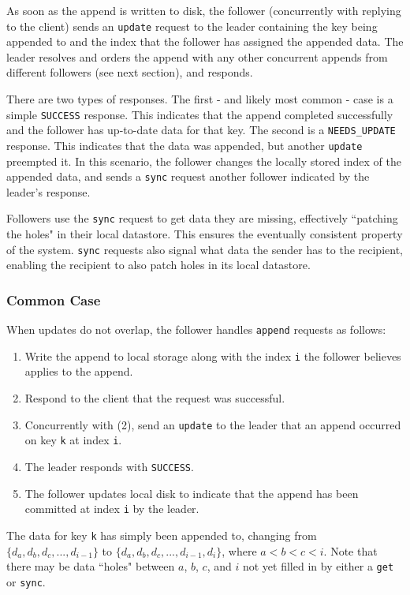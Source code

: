 \documentclass[11pt,english,twocolumn]{article}
\begin{document}
As soon as the append is written to disk, the follower (concurrently with
replying to the client) sends an \texttt{update} request to the leader
containing the key being appended to and the index that the follower has
assigned the appended data. The leader resolves and orders the append with any
other concurrent appends from different followers (see next section), and
responds.

There are two types of responses. The first - and likely most common - case
is a simple \texttt{SUCCESS} response. This indicates that the append completed
successfully and the follower has up-to-date data for that key. The second is a
\texttt{NEEDS\_UPDATE} response. This indicates that the data was appended, but
another \texttt{update} preempted it. In this scenario, the follower changes the
locally stored index of the appended data, and sends a \texttt{sync} request
another follower indicated by the leader's response.

Followers use the \texttt{sync} request to get data they are missing,
effectively ``patching the holes" in their local datastore. This ensures the
eventually consistent property of the system. \texttt{sync} requests also signal
what data the sender has to the recipient, enabling the recipient to also patch
holes in its local datastore.

\subsubsection{Common Case}
When updates do not overlap, the follower handles \texttt{append} requests as
follows:

\begin{enumerate}
	\item Write the append to local storage along with the index \texttt{i}
		the follower believes applies to the append.
	\item Respond to the client that the request was successful.
	\item Concurrently with (2), send an \texttt{update} to the leader that
		an append occurred on key \texttt{k} at index \texttt{i}.
	\item The leader responds with \texttt{SUCCESS}.
	\item The follower updates local disk to indicate that the append has
		been committed at index \texttt{i} by the leader.
\end{enumerate}

The data for key \texttt{k} has simply been appended to, changing from $\{d_a,
d_b, d_c, ..., d_{i-1}\}$ to $\{d_a, d_b, d_c, ..., d_{i-1}, d_i\}$, where $a < b <
c < i$. Note that there may be data ``holes" between $a$, $b$, $c$, and $i$ not
yet filled in by either a \texttt{get} or \texttt{sync}.
\end{document}
